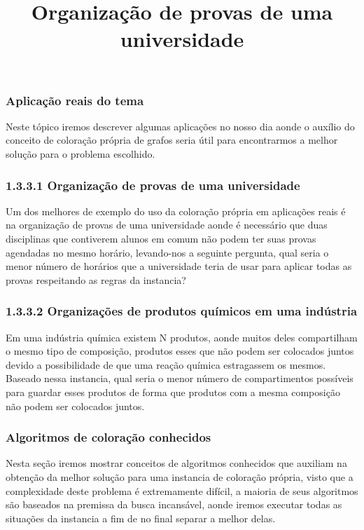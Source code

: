 \documentclass[12pt]{article}
\begin{document}
   	\subsubsection{Aplicação reais do tema}
   	
   	Neste tópico iremos descrever algumas aplicações no nosso dia aonde o auxílio do conceito de coloração própria de grafos seria útil para encontrarmos a melhor solução para o problema escolhido.
   	
   \title{Organização de provas de uma universidade}
   
   \subsubsection*{1.3.3.1 Organização de provas de uma universidade}
  
   Um dos melhores de exemplo do uso da coloração própria em aplicações reais é na organização de provas de uma universidade aonde é necessário que duas disciplinas que contiverem alunos em comum não podem ter suas provas agendadas no mesmo horário, levando-nos a seguinte pergunta, qual seria o menor número de horários que a universidade teria de usar para aplicar todas as provas respeitando as regras da instancia?
   
   
   \subsubsection*{   1.3.3.2 Organizações de produtos químicos em uma indústria}
  
   Em uma indústria química existem N produtos, aonde muitos deles compartilham o mesmo tipo de composição, produtos esses que não podem ser colocados juntos devido a possibilidade de que uma reação química estragassem os mesmos. Baseado nessa instancia, qual seria o menor número de compartimentos possíveis para guardar esses produtos de forma que produtos com a mesma composição não podem ser colocados juntos.

	\subsubsection{Algoritmos de coloração conhecidos}
	
	Nesta seção iremos mostrar conceitos de algoritmos conhecidos que auxiliam na obtenção da melhor solução para uma instancia de coloração própria, visto que a complexidade deste problema é extremamente difícil, a maioria de seus algoritmos são baseados na premissa da busca incansável, aonde iremos executar todas as situações da instancia a fim de no final separar a melhor delas.
	
\end{document}
